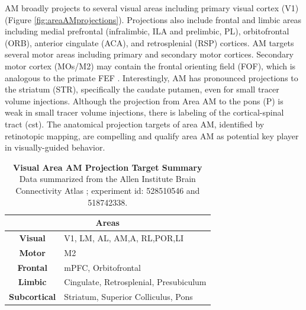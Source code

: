 AM broadly projects to several visual areas including primary visual cortex (V1) (Figure \ref{fig:areaAMprojections}). Projections also include frontal and limbic areas including medial prefrontal (infralimbic, ILA and prelimbic, PL), orbitofrontal (ORB), anterior cingulate (ACA), and retrosplenial (RSP) cortices. AM targets several motor areas including primary and secondary motor cortices. Secondary motor cortex (MOs/M2) may contain the frontal orienting field (FOF), which is analogous to the primate FEF \parencite{Erlich2011,Barthas2017}. Interestingly, AM has pronounced projections to the striatum (STR), specifically the caudate putamen, even for small tracer volume injections. Although the projection from Area AM to the pons (P) is weak in small tracer volume injections, there is labeling of the cortical-spinal tract (cst). The anatomical projection targets of area AM, identified by retinotopic mapping, are compelling and qualify area AM as potential key player in visually-guided behavior. \par 
\begin{table}
\centering
\begin{tabular}{cl}
\hline
\multicolumn{2}{c}{Areas} \\ \hline
\textbf{Visual} & V1, LM, AL, AM,A, RL,POR,LI \\
\textbf{Motor} & M2 \\
\textbf{Frontal} & mPFC, Orbitofrontal \\
\textbf{Limbic} & Cingulate, Retrosplenial, Presubiculum \\
\textbf{Subcortical} & Striatum, Superior Colliculus, Pons \\ \hline
\end{tabular}
\caption[Visual Area AM Projection Target Summary]{\textbf{Visual Area AM Projection Target Summary} Data summarized from the Allen Institute Brain Connectivity Atlas \parencite{AllenBrain2015}; experiment id: 528510546 and 518742338.}
\label{table:areaAM}
\end{table}
